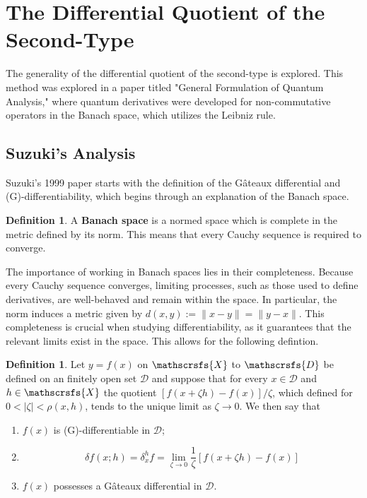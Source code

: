 \documentclass[a4paper]{article}
\theoremstyle{definition}
\newtheorem{definition}[theorem]{Definition}
\begin{document}
\section{The Differential Quotient of the Second-Type}
The generality of the differential quotient of the second-type is explored. This method was explored in a paper titled "General Formulation of Quantum Analysis,"\cite{Suzuki} where quantum derivatives were developed for non-commutative operators in the Banach space, which utilizes the Leibniz rule.
\subsection{Suzuki's Analysis}
Suzuki's 1999 paper \cite{Suzuki} starts with the definition of the Gâteaux differential and (G)-differentiability, which begins through an explanation of the Banach space. 

\begin{definition}
	A \textbf{Banach space }is a normed space which is complete in the metric defined by its norm. This means that every Cauchy sequence is required to converge.\cite{Hille1996-oh,Suzuki,Rudin1990-le}
\end{definition}
The importance of working in Banach spaces lies in their completeness. Because every Cauchy sequence converges, limiting processes, such as those used to define derivatives, are well-behaved and remain within the space. In particular, the norm induces a metric given by $  d(x,y) := \|x - y\| = \|y - x\|  $. This completeness is crucial when studying differentiability, as it guarantees that the relevant limits exist in the space. This allows for the following defintion.
\begin{definition}
	Let $y=f(x)$ on $\mathscrsfs{X}$ to $\mathscrsfs{D}$ be defined on an finitely open set $\mathcal{D}$ and suppose that for every $x\in\mathcal{D}$ and $h\in\mathscrsfs{X}$ the quotient $[f(x+\zeta h)-f(x)]/\zeta$, which defined for $0<|\zeta|<\rho(x,h)$, tends to the unique limit as $\zeta\to0$. We then say that
	\begin{enumerate}
		\item $f(x)$ is (G)-differentiable in $\mathcal{D}$;
		\item \begin{equation}
			\delta f(x;h)=\delta_x^hf=\lim_{\zeta\to0}\frac{1}{\zeta}[f(x+\zeta h)-f(x)]
		\end{equation}
		\item $f(x)$ possesses a Gâteaux differential in $\mathcal{D}$.
	\end{enumerate}
\end{definition}
\end{document}
